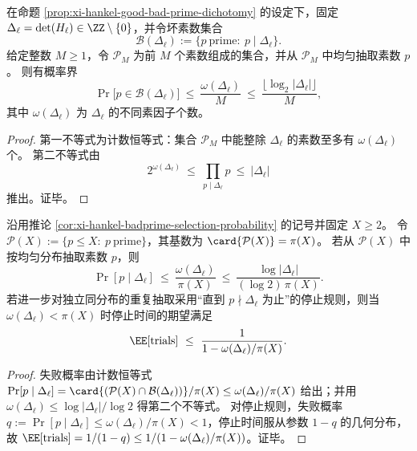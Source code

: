 \begin{corollary}\label{cor:xi-hankel-badprime-selection-probability}
在命题 \ref{prop:xi-hankel-good-bad-prime-dichotomy} 的设定下，固定 \(\Delta_\ell=\det(H_\ell)\in\ZZ\setminus\{0\}\)，并令坏素数集合
\[
\mathcal B(\Delta_\ell):=\{p\ \text{prime}:\ p\mid \Delta_\ell\}.
\]
给定整数 \(M\ge 1\)，令 \(\mathcal P_M\) 为前 \(M\) 个素数组成的集合，并从 \(\mathcal P_M\) 中均匀抽取素数 \(p\)。
则有概率界
\[
\Pr\bigl[p\in\mathcal B(\Delta_\ell)\bigr]
\ \le\ \frac{\omega(\Delta_\ell)}{M}
\ \le\ \frac{\lfloor \log_2|\Delta_\ell|\rfloor}{M},
\]
其中 \(\omega(\Delta_\ell)\) 为 \(\Delta_\ell\) 的不同素因子个数。
\end{corollary}
\begin{proof}
第一不等式为计数恒等式：集合 \(\mathcal P_M\) 中能整除 \(\Delta_\ell\) 的素数至多有 \(\omega(\Delta_\ell)\) 个。
第二不等式由
\[
2^{\omega(\Delta_\ell)}\ \le\ \prod_{p\mid \Delta_\ell}p\ \le\ |\Delta_\ell|
\]
推出。证毕。
\end{proof}

\begin{corollary}[有界素数集均匀抽取的失败概率与期望尝试次数]\label{cor:xi-hankel-badprime-selection-trials}
沿用推论 \ref{cor:xi-hankel-badprime-selection-probability} 的记号并固定 \(X\ge 2\)。
令 \(\mathcal P(X):=\{p\le X:\ p\ \text{prime}\}\)，其基数为 \(\card{\mathcal P(X)}=\pi(X)\)。
若从 \(\mathcal P(X)\) 中按均匀分布抽取素数 \(p\)，则
\[
\Pr[p\mid \Delta_\ell]
\ \le\
\frac{\omega(\Delta_\ell)}{\pi(X)}
\ \le\
\frac{\log|\Delta_\ell|}{(\log 2)\,\pi(X)}.
\]
若进一步对独立同分布的重复抽取采用“直到 \(p\nmid\Delta_\ell\) 为止”的停止规则，则当 \(\omega(\Delta_\ell)<\pi(X)\) 时停止时间的期望满足
\[
\EE[\mathrm{trials}]
\ \le\
\frac{1}{1-\omega(\Delta_\ell)/\pi(X)}.
\]
\end{corollary}
\begin{proof}
失败概率由计数恒等式
\(
\Pr[p\mid \Delta_\ell]=\card{(\mathcal P(X)\cap\mathcal B(\Delta_\ell))}/\pi(X)
\le \omega(\Delta_\ell)/\pi(X)
\)
给出；并用 \(\omega(\Delta_\ell)\le \log|\Delta_\ell|/\log 2\) 得第二个不等式。
对停止规则，失败概率 \(q:=\Pr[p\mid\Delta_\ell]\le \omega(\Delta_\ell)/\pi(X)<1\)，停止时间服从参数 \(1-q\) 的几何分布，故 \(\EE[\mathrm{trials}]=1/(1-q)\le 1/(1-\omega(\Delta_\ell)/\pi(X))\)。证毕。
\end{proof}

